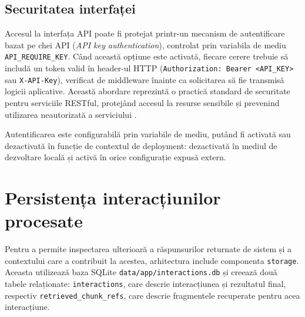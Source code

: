 \documentclass[12pt, a4paper, oneside, romanian]{teza-upb}
\begin{document}
\subsection{Securitatea interfaței}

Accesul la interfața API poate fi protejat printr-un mecanism de autentificare bazat pe chei API (\textit{API key authentication}), controlat prin variabila de mediu \texttt{API\_REQUIRE\_KEY}. Când această opțiune este activată, fiecare cerere trebuie să includă un token valid în header-ul HTTP (\texttt{Authorization: Bearer <API\_KEY>} sau \texttt{X-API-Key}), verificat de middleware înainte ca solicitarea să fie transmisă logicii aplicative. Această abordare reprezintă o practică standard de securitate pentru serviciile RESTful, protejând accesul la resurse sensibile și prevenind utilizarea neautorizată a serviciului \cite{flask_doc}.

Autentificarea este configurabilă prin variabile de mediu, putând fi 
activată sau dezactivată în funcție de contextul de deployment: 
dezactivată în mediul de dezvoltare locală și activă în orice 
configurație expusă extern.

\section{Persistența interacțiunilor procesate}

Pentru a permite inspectarea ulterioară a răspunsurilor returnate de sistem și a contextului care a contribuit la acestea, arhitectura include componenta \texttt{storage}. Aceasta utilizează baza SQLite \texttt{data/app/interactions.db} și creează două tabele relaționate: \texttt{interactions}, care descrie interacțiunea și rezultatul final, respectiv \texttt{retrieved\_chunk\_refs}, care descrie fragmentele recuperate pentru acea interacțiune.
\end{document}
